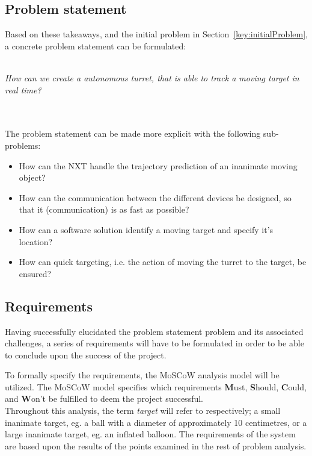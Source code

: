 \subsection{Problem statement}
Based on these takeaways, and the initial problem in Section~\ref{key:initialProblem}, a concrete problem statement can be formulated:\\~\\
\begin{center}

	\textit{\large{How can we create a autonomous turret, that is able to track a moving target in real time?}}
\end{center}~\\~\\

The problem statement can be made more explicit with the following sub-problems:
\begin{center}
	\begin{itemize}
		\item How can the NXT handle the trajectory prediction of an inanimate moving object?
		\item How can the communication between the different devices be designed, so that it (communication) is as fast as possible?
		\item How can a software solution identify a moving target and specify it's location?
		\item How can quick targeting, i.e. the action of moving the turret to the target, be ensured?
	\end{itemize}
\end{center}


\subsection{Requirements}\label{subsec:requirements}
Having successfully elucidated the problem statement problem and its associated challenges, a series  of requirements will have to be formulated in order to be able to conclude upon the success of the project.

To formally specify the requirements, the MoSCoW analysis model will be utilized.
The MoSCoW model specifies which requirements \textbf{M}ust, \textbf{S}hould, \textbf{C}ould, and \textbf{W}on't be fulfilled to deem the project successful.\\

Throughout this analysis, the term \textit{target} will refer to respectively; a small inanimate target, eg{.} a ball with a diameter of approximately 10 centimetres, or a large inanimate target, eg{.} an inflated balloon.
The requirements of the system are based upon the results of the points examined in the rest of problem analysis.

